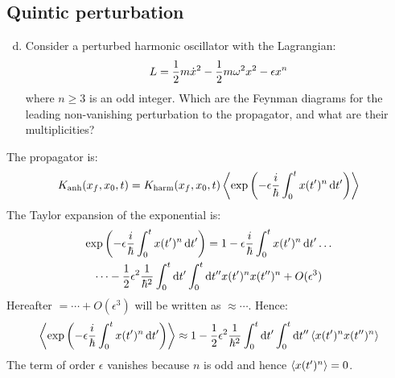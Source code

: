 \subsection{Quintic perturbation}

\begin{enumerate}[(a)]
  \setcounter{enumi}{3}
  \item Consider a perturbed harmonic oscillator with the Lagrangian:
        \begin{equation}
          L = \half m \dot{x}^2 - \half m \omega^2 x^2 - \epsilon x^n
        \end{equation}
        where $n \geq 3$ is an odd integer.
        Which are the Feynman diagrams for the leading non-vanishing perturbation to
        the propagator, and what are their multiplicities?
\end{enumerate}

The propagator is:
\begin{align*}
  \propone[anh] = \propone[harm] \avg{\exp\left(-\epsilon\ihbar\int_0^t x(\tp)^n \,\dtp \right)}
\end{align*}
The Taylor expansion of the exponential is:
\begin{multline*}
  \exp\left(-\epsilon\ihbar\int_0^t x(\tp)^n \,\dtp \right)
  = 1 - \epsilon\ihbar\int_0^t x(\tp)^n \,\dtp \dots
  \\
  \dots
  - \frac{1}{2}\epsilon^2\frac{1}{\hbar^2}
  \int_0^t\dtp \int_0^t\dtpp
  x(\tp)^n x(\tpp)^n
  + O(\epsilon^3)
\end{multline*}
Hereafter $=\cdots + O(\epsilon^3)$ will be written as $\approx\cdots$.
Hence:
\begin{equation*}
  \avg{\exp\left(-\epsilon\ihbar\int_0^t x(\tp)^n \,\dtp \right)}
  \approx 1
  - \frac{1}{2}\epsilon^2\frac{1}{\hbar^2}
  \int_0^t\dtp \int_0^t\dtpp
  \avg{x(\tp)^n x(\tpp)^n}
\end{equation*}
The term of order $\epsilon$ vanishes because $n$ is odd and hence
$\avg{x(\tp)^n} = 0$.

